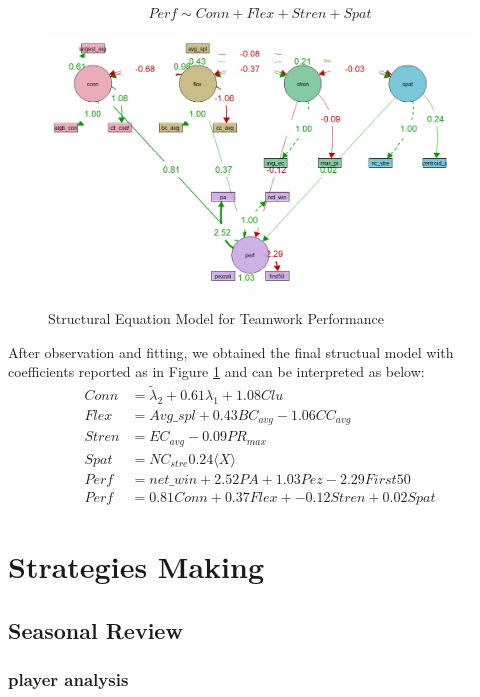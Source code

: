 \documentclass{mcmthesis}
\begin{document}
\begin{equation}
  Perf \sim Conn + Flex + Stren + Spat
\end{equation}

\begin{figure}[htbp]
  \centering
  \caption{Structural Equation Model for Teamwork Performance}
  \includegraphics[width=15cm]{sem.png}
  \label{sem}
\end{figure}
After observation and fitting, we obtained the final structual model with coefficients reported as in Figure \ref{sem} and can be interpreted as below:
\begin{equation}
  \begin{split}
    Conn &= \tilde\lambda_2 + 0.61\lambda_1 + 1.08Clu \\
    Flex  &= Avg\_spl + 0.43BC_{avg} - 1.06CC_{avg} \\
    Stren &= EC_{avg} -0.09 PR_{max} \\
    Spat &= NC_{stre} 0.24 \langle X\rangle \\
    Perf &= net\_win + 2.52PA + 1.03Pez - 2.29First50 \\
    Perf &= 0.81Conn + 0.37Flex + -0.12Stren + 0.02Spat
  \end{split}
\end{equation}

\section{Strategies Making}
\subsection{Seasonal Review}
\subsubsection{player analysis}
\end{document}

